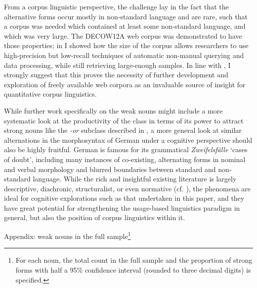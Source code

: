 \begin{styleMoutonText}
From a corpus linguistic perspective, the challenge lay in the fact that the alternative forms occur mostly in non-standard language and are rare, such that a corpus was needed which contained at least some non-standard language, and which was very large. The DECOW12A web corpus was demonstrated to have those properties; in  I showed how the size of the corpus allows researchers to use high-precision but low-recall techniques of automatic non-manual querying and data processing, while still retrieving large-enough samples. In line with , I strongly suggest that this proves the necessity of further development and exploration of freely available web corpora as an invaluable source of insight for quantitative corpus linguistics.
\end{styleMoutonText}

\begin{styleMoutonText}
While further work specifically on the weak nouns might include a more systematic look at the productivity of the class in terms of its power to attract strong nouns like the \textit{\nobreakdash-or} subclass described in , a more general look at similar alternations in the morphosyntax of German under a cognitive perspective should also be highly fruitful. German is famous for its grammatical \textit{Zweifelsfälle} ‘cases of doubt’, including many instances of co-existing, alternating forms in nominal and verbal morphology and blurred boundaries between standard and non-standard language. While the rich and insightful existing literature is largely descriptive, diachronic, structuralist, or even normative (cf. \citealt{Klein2009}), the phenomena are ideal for cognitive explorations such as that undertaken in this paper, and they have great potential for strengthening the usage-based linguistics paradigm in general, but also the position of corpus linguistics within it.
\end{styleMoutonText}

\begin{styleMoutonHeadingi}
Appendix: weak nouns in the full sample\footnote{For each noun, the total count in the full sample and the proportion of strong forms with half a 95\% confidence interval (rounded to three decimal digits) is specified.}
\end{styleMoutonHeadingi}

